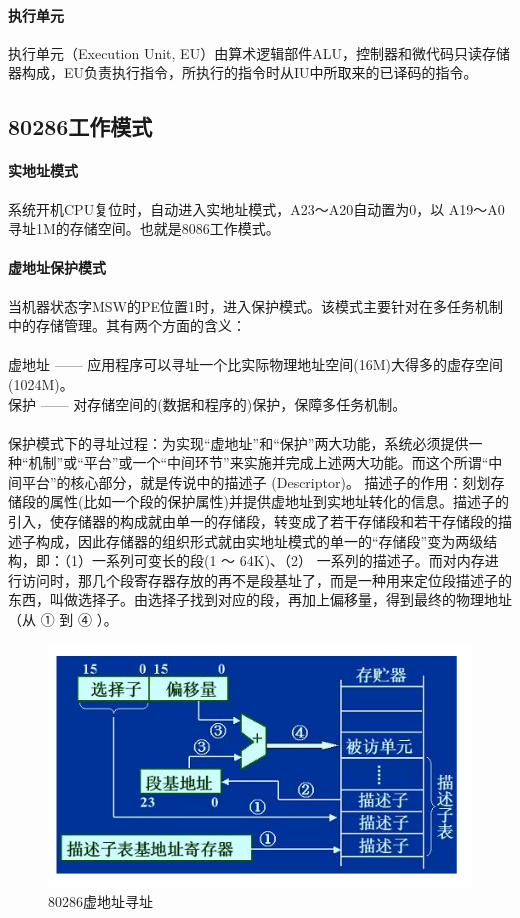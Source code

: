 \documentclass[12pt]{article}
\begin{document}
\paragraph{执行单元}
执行单元（Execution Unit, EU）由算术逻辑部件ALU，控制器和微代码只读存储器构成，EU负责执行指令，所执行的指令时从IU中所取来的已译码的指令。
\subsection{80286工作模式}
\paragraph{实地址模式}
系统开机CPU复位时，自动进入实地址模式，A23～A20自动置为0，以 A19～A0寻址1M的存储空间。也就是8086工作模式。
\paragraph{虚地址保护模式}
当机器状态字MSW的PE位置1时，进入保护模式。该模式主要针对在多任务机制中的存储管理。其有两个方面的含义：\\\\
虚地址 —— 应用程序可以寻址一个比实际物理地址空间(16M)大得多的虚存空间(1024M)。\\
保护 —— 对存储空间的(数据和程序的)保护，保障多任务机制。\\\\
保护模式下的寻址过程：为实现“虚地址”和“保护”两大功能，系统必须提供一种“机制”或“平台”或一个“中间环节”来实施并完成上述两大功能。而这个所谓“中间平台”的核心部分，就是传说中的描述子 (Descriptor)。
描述子的作用：刻划存储段的属性(比如一个段的保护属性)并提供虚地址到实地址转化的信息。描述子的引入，使存储器的构成就由单一的存储段，转变成了若干存储段和若干存储段的描述子构成，因此存储器的组织形式就由实地址模式的单一的“存储段”变为两级结构，即：（1）一系列可变长的段(1 ～ 64K)、（2） 一系列的描述子。而对内存进行访问时，那几个段寄存器存放的再不是段基址了，而是一种用来定位段描述子的东西，叫做选择子。由选择子找到对应的段，再加上偏移量，得到最终的物理地址（从 ① 到 ④ ）。
\begin{figure}[htbp]
\centering
\includegraphics[scale=0.7]{fig/16.png}
\caption{80286虚地址寻址}
\label{fig:80286 virtual memory}
\end{figure}
\end{document}
